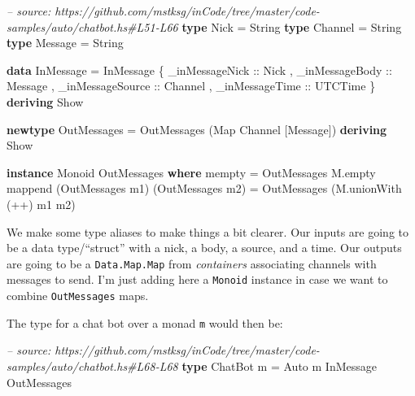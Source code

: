 \documentclass[]{article}
\newenvironment{Shaded}{}{}
\newcommand{\KeywordTok}[1]{\textcolor[rgb]{0.00,0.44,0.13}{\textbf{#1}}}
\newcommand{\DataTypeTok}[1]{\textcolor[rgb]{0.56,0.13,0.00}{#1}}
\newcommand{\CommentTok}[1]{\textcolor[rgb]{0.38,0.63,0.69}{\textit{#1}}}
\newcommand{\OtherTok}[1]{\textcolor[rgb]{0.00,0.44,0.13}{#1}}
\newcommand{\FunctionTok}[1]{\textcolor[rgb]{0.02,0.16,0.49}{#1}}
\newcommand{\NormalTok}[1]{#1}
\begin{document}
\begin{Shaded}
\begin{Highlighting}[]
\CommentTok{-- source: https://github.com/mstksg/inCode/tree/master/code-samples/auto/chatbot.hs#L51-L66}
\KeywordTok{type} \DataTypeTok{Nick}    \FunctionTok{=} \DataTypeTok{String}
\KeywordTok{type} \DataTypeTok{Channel} \FunctionTok{=} \DataTypeTok{String}
\KeywordTok{type} \DataTypeTok{Message} \FunctionTok{=} \DataTypeTok{String}

\KeywordTok{data} \DataTypeTok{InMessage} \FunctionTok{=} \DataTypeTok{InMessage}\NormalTok{ \{}\OtherTok{ _inMessageNick   ::} \DataTypeTok{Nick}
\NormalTok{                           ,}\OtherTok{ _inMessageBody   ::} \DataTypeTok{Message}
\NormalTok{                           ,}\OtherTok{ _inMessageSource ::} \DataTypeTok{Channel}
\NormalTok{                           ,}\OtherTok{ _inMessageTime   ::} \DataTypeTok{UTCTime}
\NormalTok{                           \} }\KeywordTok{deriving} \DataTypeTok{Show}

\KeywordTok{newtype} \DataTypeTok{OutMessages} \FunctionTok{=} \DataTypeTok{OutMessages}\NormalTok{ (}\DataTypeTok{Map} \DataTypeTok{Channel}\NormalTok{ [}\DataTypeTok{Message}\NormalTok{]) }\KeywordTok{deriving} \DataTypeTok{Show}

\KeywordTok{instance} \DataTypeTok{Monoid} \DataTypeTok{OutMessages} \KeywordTok{where}
\NormalTok{    mempty  }\FunctionTok{=} \DataTypeTok{OutMessages}\NormalTok{ M.empty}
\NormalTok{    mappend (}\DataTypeTok{OutMessages}\NormalTok{ m1) (}\DataTypeTok{OutMessages}\NormalTok{ m2)}
            \FunctionTok{=} \DataTypeTok{OutMessages}\NormalTok{ (M.unionWith (}\FunctionTok{++}\NormalTok{) m1 m2)}
\end{Highlighting}
\end{Shaded}

We make some type aliases to make things a bit clearer. Our inputs are going to
be a data type/``struct'' with a nick, a body, a source, and a time. Our outputs
are going to be a \texttt{Data.Map.Map} from \emph{containers} associating
channels with messages to send. I'm just adding here a \texttt{Monoid} instance
in case we want to combine \texttt{OutMessages} maps.

The type for a chat bot over a monad \texttt{m} would then be:

\begin{Shaded}
\begin{Highlighting}[]
\CommentTok{-- source: https://github.com/mstksg/inCode/tree/master/code-samples/auto/chatbot.hs#L68-L68}
\KeywordTok{type} \DataTypeTok{ChatBot}\NormalTok{ m }\FunctionTok{=} \DataTypeTok{Auto}\NormalTok{ m }\DataTypeTok{InMessage} \DataTypeTok{OutMessages}
\end{Highlighting}
\end{Shaded}
\end{document}
